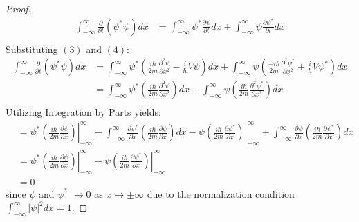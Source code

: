 \documentclass[hidelinks, a4paper, 12pt]{article}
\begin{document}
\begin{proof}
\[\begin{split}
                \int_{-\infty}^{\infty}\frac{\partial}{\partial t} (\psi^*\psi) dx &= \int_{-\infty}^{\infty} \psi^* \frac{\partial\psi}{\partial t} dx + \int_{-\infty}^{\infty} \psi \frac{\partial\psi^*}{\partial t} dx\\
            \end{split}\]
            Substituting $(3)$ and $(4)$:
            \[\begin{split}
                \int_{-\infty}^{\infty}\frac{\partial}{\partial t} (\psi^*\psi) dx &= \int_{-\infty}^{\infty} \psi^* \left(\frac{i\hbar}{2m}\frac{\partial^2\psi}{\partial x^2} - \frac{i}{\hbar} V\psi\right) dx + \int_{-\infty}^{\infty} \psi \left(\frac{-i\hbar}{2m}\frac{\partial^2\psi^*}{\partial x^2} + \frac{i}{\hbar} V\psi^*\right) dx\\
                                                                                   &= \int_{-\infty}^{\infty} \psi^* \left(\frac{i\hbar}{2m}\frac{\partial^2\psi}{\partial x^2}\right) dx - \int_{-\infty}^{\infty} \psi \left(\frac{i\hbar}{2m}\frac{\partial^2\psi^*}{\partial x^2}\right) dx\\
            \end{split}\]
            Utilizing Integration by Parts yields:
            \[\begin{split}
                &= \left.\psi^* \left(\frac{i\hbar}{2m}\frac{\partial\psi}{\partial x}\right) \right\rvert_{-\infty}^{\infty} - \int_{-\infty}^{\infty} \frac{\partial\psi^*}{\partial x} \left(\frac{i\hbar}{2m}\frac{\partial\psi}{\partial x}\right) dx - \left.\psi \left(\frac{i\hbar}{2m}\frac{\partial\psi^*}{\partial x}\right) \right\rvert_{-\infty}^{\infty} + \int_{-\infty}^{\infty} \frac{\partial\psi}{\partial x} \left(\frac{i\hbar}{2m}\frac{\partial\psi^*}{\partial x}\right) dx\\
                &= \left.\psi^* \left(\frac{i\hbar}{2m}\frac{\partial\psi}{\partial x}\right) \right\rvert_{-\infty}^{\infty} - \left.\psi \left(\frac{i\hbar}{2m}\frac{\partial\psi^*}{\partial x}\right) \right\rvert_{-\infty}^{\infty}\\
                &= 0
            \end{split}\]
            since $\psi$ and $\psi^*$ $\rightarrow 0$ as $x \rightarrow \pm \infty$ due to the normalization condition $\int_{-\infty}^{\infty}|\psi|^2dx = 1$.
        \end{proof}

    
    
\end{document}
